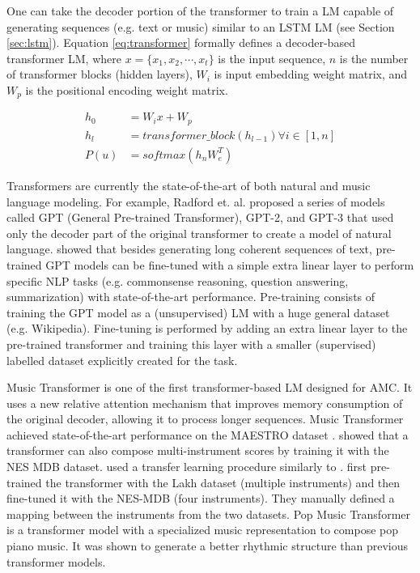 One can take the decoder portion of the transformer to train a LM capable of generating sequences (e.g. text or music) similar to an LSTM LM (see Section \ref{sec:lstm}). Equation \ref{eq:transformer} formally defines a decoder-based transformer LM, where $x = \{x_1, x_2, \cdots, x_t\}$ is the input sequence, $n$ is the number of transformer blocks (hidden layers), $W_i$ is input embedding weight matrix, and $W_p$ is the positional encoding weight matrix.

\begin{equation}\label{eq:transformer}
\begin{split}
    h_0 &= W_ix + W_p \\
    h_l &= transformer\_block(h_{l-1}) \forall i \in [1,n] \\
    P(u) &= softmax(h_nW_e^T)
\end{split}
\end{equation}

Transformers are currently the state-of-the-art of both natural and music language modeling. For example, Radford et. al. \cite{Radford2018, radford2019language} proposed a series of models called GPT (General Pre-trained Transformer), GPT-2, and GPT-3 that used only the decoder part of the original transformer to create a model of natural language. \citet{Radford2018} showed that besides generating long coherent sequences of text, pre-trained GPT models can be fine-tuned with a simple extra linear layer to perform specific NLP tasks (e.g. commonsense reasoning, question answering, summarization) with state-of-the-art performance. Pre-training consists of training the GPT model as a (unsupervised) LM with a huge general dataset (e.g. Wikipedia). Fine-tuning is performed by adding an extra linear layer to the pre-trained transformer and training this layer with a smaller (supervised) labelled dataset explicitly created for the task.

Music Transformer \cite{huang2018music} is one of the first transformer-based LM designed for AMC. It uses a new relative attention mechanism that improves memory consumption of the original decoder, allowing it to process longer sequences. Music Transformer achieved state-of-the-art performance on the MAESTRO dataset \cite{hawthorne2018enabling}. \citet{donahue2019lakhnes} showed that a transformer can also compose multi-instrument scores by training it with the NES MDB \cite{donahue2018nesmdb} dataset. \citet{donahue2018nesmdb} used a transfer learning procedure similarly to \citet{Radford2018}. \citet{donahue2018nesmdb} first pre-trained the transformer with the Lakh dataset (multiple instruments) and then fine-tuned it with the NES-MDB (four instruments). They manually defined a mapping between the instruments from the two datasets. Pop Music Transformer \cite{huang2020pop} is a transformer model with a specialized music representation to compose pop piano music. It was shown to generate a better rhythmic structure than previous transformer models.


